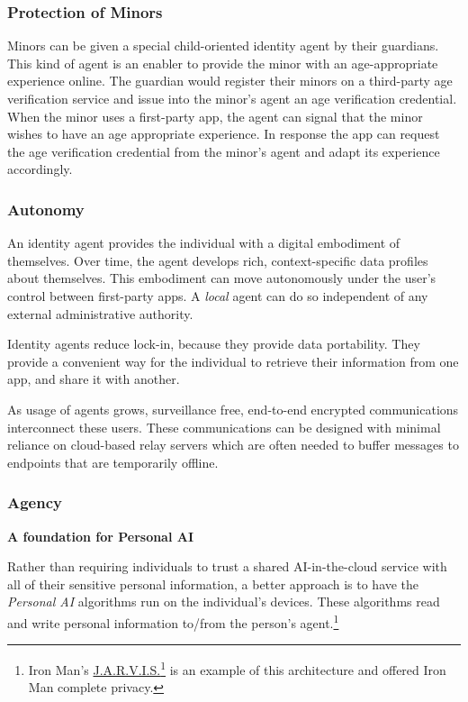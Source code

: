 \documentclass[11pt, oneside]{article}   	%
\newcommand{\hyperfootnote}[1][]{\def\ArgI{{#1}}\hyperfootnoteRelay}
\newcommand\hyperfootnoteRelay[2][]{\href{#1#2}{\ArgI}\footnote{\href{#1#2}{#2}}}
\begin{document}
\subsubsection{Protection of Minors}

Minors can be given a special child-oriented identity agent by their guardians. This kind of agent is an enabler to  provide the minor with an age-appropriate experience online. The guardian would register their minors on a third-party age verification service and issue into the minor's agent an age verification credential. When the minor uses a first-party app, the agent can signal that the minor wishes to have an age appropriate experience. In response the app can request the age verification credential from the minor's agent and adapt its experience accordingly.

\subsubsection{Autonomy}

An identity agent provides the individual with a digital embodiment of themselves. Over time, the agent develops rich, context-specific data profiles about themselves. This embodiment can move autonomously under the user's control between first-party apps. A \emph{local} agent can do so independent of any external administrative authority. 

Identity agents reduce lock-in, because they provide data portability. They provide a convenient way for the individual to retrieve their information from one app, and share it with another. 

As usage of agents grows, surveillance free, end-to-end encrypted communications interconnect these users. These communications can be designed with minimal reliance on cloud-based relay servers which are often needed to buffer messages to endpoints that are temporarily offline.

\subsubsection{Agency}

\textbf{A foundation for Personal AI}

Rather than requiring individuals to trust a shared AI-in-the-cloud service with all of their sensitive personal information, a better approach is to have the \emph{Personal AI} algorithms run on the individual's devices. These algorithms read and write personal information to/from the person's agent.\footnote{Iron Man's \hyperfootnote[J.A.R.V.I.S.][https://]{en.wikipedia.org/wiki/J.A.R.V.I.S.} is an example of this architecture and offered Iron Man complete privacy.}
\end{document}
